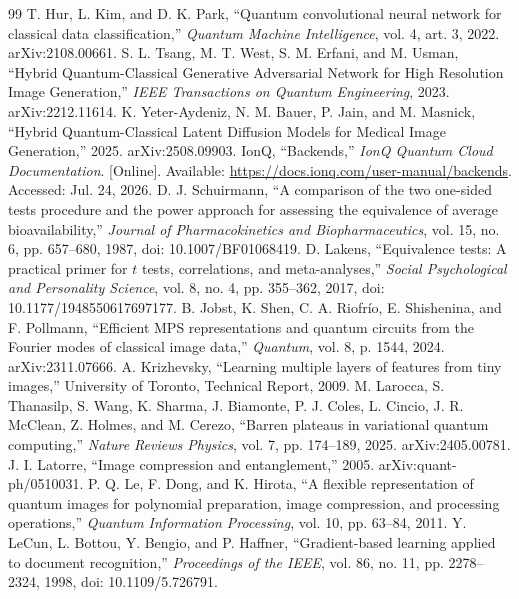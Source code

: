 \documentclass[11pt]{article}
\begin{document}
\begin{thebibliography}{99}
 T. Hur, L. Kim, and D. K. Park, ``Quantum convolutional neural network for classical data classification,'' \textit{Quantum Machine Intelligence}, vol. 4, art. 3, 2022. arXiv:2108.00661.
 S. L. Tsang, M. T. West, S. M. Erfani, and M. Usman, ``Hybrid Quantum-Classical Generative Adversarial Network for High Resolution Image Generation,'' \textit{IEEE Transactions on Quantum Engineering}, 2023. arXiv:2212.11614.
 K. Yeter-Aydeniz, N. M. Bauer, P. Jain, and M. Masnick, ``Hybrid Quantum-Classical Latent Diffusion Models for Medical Image Generation,'' 2025. arXiv:2508.09903.
 IonQ, ``Backends,'' \textit{IonQ Quantum Cloud Documentation}. [Online]. Available: \url{https://docs.ionq.com/user-manual/backends}. Accessed: Jul. 24, 2026.
 D. J. Schuirmann, ``A comparison of the two one-sided tests procedure and the power approach for assessing the equivalence of average bioavailability,'' \textit{Journal of Pharmacokinetics and Biopharmaceutics}, vol. 15, no. 6, pp. 657--680, 1987, doi: 10.1007/BF01068419.
 D. Lakens, ``Equivalence tests: A practical primer for $t$ tests, correlations, and meta-analyses,'' \textit{Social Psychological and Personality Science}, vol. 8, no. 4, pp. 355--362, 2017, doi: 10.1177/1948550617697177.
 B. Jobst, K. Shen, C. A. Riofr\'io, E. Shishenina, and F. Pollmann, ``Efficient MPS representations and quantum circuits from the Fourier modes of classical image data,'' \textit{Quantum}, vol. 8, p. 1544, 2024. arXiv:2311.07666.
 A. Krizhevsky, ``Learning multiple layers of features from tiny images,'' University of Toronto, Technical Report, 2009.
 M. Larocca, S. Thanasilp, S. Wang, K. Sharma, J. Biamonte, P. J. Coles, L. Cincio, J. R. McClean, Z. Holmes, and M. Cerezo, ``Barren plateaus in variational quantum computing,'' \textit{Nature Reviews Physics}, vol. 7, pp. 174--189, 2025. arXiv:2405.00781.
 J. I. Latorre, ``Image compression and entanglement,'' 2005. arXiv:quant-ph/0510031.
 P. Q. Le, F. Dong, and K. Hirota, ``A flexible representation of quantum images for polynomial preparation, image compression, and processing operations,'' \textit{Quantum Information Processing}, vol. 10, pp. 63--84, 2011.
 Y. LeCun, L. Bottou, Y. Bengio, and P. Haffner, ``Gradient-based learning applied to document recognition,'' \textit{Proceedings of the IEEE}, vol. 86, no. 11, pp. 2278--2324, 1998, doi: 10.1109/5.726791.

\end{thebibliography}
\end{document}
